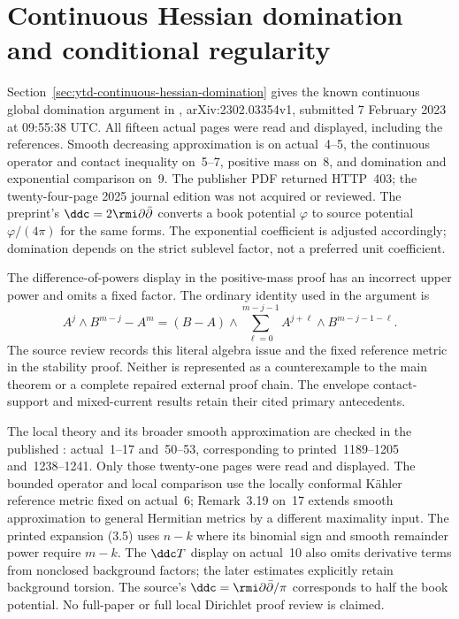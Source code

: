 \section{Continuous Hessian domination and conditional regularity}
\label{sec:provenance-continuous-hessian-domination}

Section~\ref{sec:ytd-continuous-hessian-domination} gives the known
continuous global domination argument in
\cite{GuedjLu23HessianV1}, arXiv:\allowbreak 2302.03354v1, submitted
7 February 2023 at 09:55:38 UTC. All fifteen actual pages were read
and displayed, including the references. Smooth decreasing approximation
is on actual~4--5, the continuous operator and contact inequality
on~5--7, positive mass on~8, and domination and exponential comparison
on~9. The publisher PDF returned HTTP~403; the twenty-four-page 2025
journal edition was not acquired or reviewed. The preprint's
$\ddc=2\rmi\partial\bar\partial$ converts a book potential
$\varphi$ to source potential $\varphi/(4\pi)$ for the same forms.
The exponential coefficient is adjusted accordingly; domination
depends on the strict sublevel factor, not a preferred unit coefficient.

The difference-of-powers display in the positive-mass proof has an
incorrect upper power and omits a fixed factor. The ordinary identity
used in the argument is
\[
 A^j\wedge B^{m-j}-A^m
   =(B-A)\wedge
       \sum_{\ell=0}^{m-j-1}A^{j+\ell}\wedge B^{m-j-1-\ell}.
\]
The source review records this literal algebra issue and the fixed
reference metric in the stability proof. Neither is represented as
a counterexample to the main theorem or a complete repaired external
proof chain. The envelope contact-support and mixed-current results
retain their cited primary antecedents.

The local theory and its broader smooth approximation are checked
in the published \cite{GuNguyen18DirichletPublished}: actual~1--17
and~50--53, corresponding to printed~1189--1205 and~1238--1241.
Only those twenty-one pages were read and displayed. The bounded
operator and local comparison use the locally conformal K\"ahler
reference metric fixed on actual~6; Remark~3.19 on~17 extends
smooth approximation to general Hermitian metrics by a different
maximality input. The printed expansion (3.5) uses $n-k$ where its
binomial sign and smooth remainder power require $m-k$. The
$\ddc T$ display on actual~10 also omits derivative terms from
nonclosed background factors; the later estimates explicitly retain
background torsion. The source's
$\ddc=\rmi\partial\bar\partial/\pi$ corresponds to half the book
potential. No full-paper or full local Dirichlet proof review is claimed.

